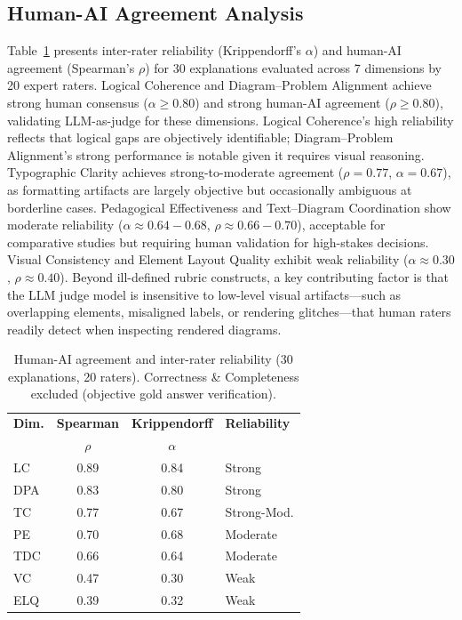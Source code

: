 \documentclass[11pt]{article}
\begin{document}
\subsection{Human-AI Agreement Analysis}

Table~\ref{tab:human-ai} presents inter-rater reliability (Krippendorff's $\alpha$) and human-AI agreement (Spearman's $\rho$) for 30 explanations evaluated across 7 dimensions by 20 expert raters. Logical Coherence and Diagram--Problem Alignment achieve strong human consensus ($\alpha \geq 0.80$) and strong human-AI agreement ($\rho \geq 0.80$), validating LLM-as-judge for these dimensions. Logical Coherence's high reliability reflects that logical gaps are objectively identifiable; Diagram--Problem Alignment's strong performance is notable given it requires visual reasoning. Typographic Clarity achieves strong-to-moderate agreement ($\rho = 0.77$, $\alpha = 0.67$), as formatting artifacts are largely objective but occasionally ambiguous at borderline cases. Pedagogical Effectiveness and Text--Diagram Coordination show moderate reliability ($\alpha \approx 0.64-0.68$, $\rho \approx 0.66-0.70$), acceptable for comparative studies but requiring human validation for high-stakes decisions. Visual Consistency and Element Layout Quality exhibit weak reliability ($\alpha \approx 0.30$, $\rho \approx 0.40$). Beyond ill-defined rubric constructs, a key contributing factor is that the LLM judge model is insensitive to low-level visual artifacts---such as overlapping elements, misaligned labels, or rendering glitches---that human raters readily detect when inspecting rendered diagrams.

\begin{table}[h]
\centering
\small
\begin{tabular}{lccl}
\hline
\textbf{Dim.} & \textbf{Spearman} & \textbf{Krippendorff} & \textbf{Reliability} \\
 & \textbf{$\rho$} & \textbf{$\alpha$} & \\
\hline
LC & 0.89 & 0.84 & Strong \\
DPA & 0.83 & 0.80 & Strong \\
TC & 0.77 & 0.67 & Strong-Mod. \\
PE & 0.70 & 0.68 & Moderate \\
TDC & 0.66 & 0.64 & Moderate \\
VC & 0.47 & 0.30 & Weak \\
ELQ & 0.39 & 0.32 & Weak \\
\hline
\end{tabular}
\caption{Human-AI agreement and inter-rater reliability (30 explanations, 20 raters). Correctness \& Completeness excluded (objective gold answer verification).}
\label{tab:human-ai}
\end{table}
\end{document}
